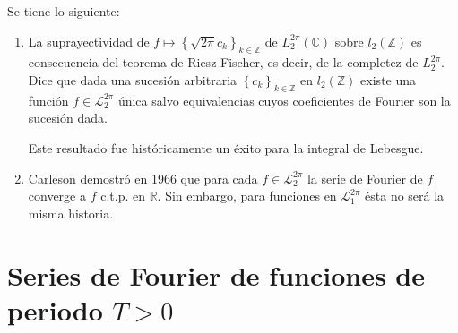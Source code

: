 \documentclass[12pt]{report}
\theoremstyle{largebreak}
\begin{document}
    \begin{obs}
        Se tiene lo siguiente:
        \begin{enumerate}
            \item La suprayectividad de $f\mapsto\left\{\sqrt{2\pi}c_k \right\}_{ k\in\mathbb{Z}}$ de $L_2^{2\pi}(\mathbb{C})$ sobre $l_2(\mathbb{Z})$ es consecuencia del teorema de Riesz-Fischer, es decir, de la completez de $L_2^{2\pi}$. Dice que dada una sucesión arbitraria $\left\{c_k\right\}_{k\in\mathbb{Z}}$ en $l_2(\mathbb{Z})$ existe una función $f\in\mathcal{L}_2^{2\pi}$ única salvo equivalencias cuyos coeficientes de Fourier son la sucesión dada.
            
            Este resultado fue históricamente un éxito para la integral de Lebesgue.

            \item Carleson demostró en 1966 que para cada $f\in\mathcal{L}_2^{2\pi}$ la serie de Fourier de $f$ converge a $f$ c.t.p. en $\mathbb{R}$. Sin embargo, para funciones en $\mathcal{L}_1^{2\pi}$ ésta no será la misma historia.
        \end{enumerate}
    \end{obs}

    \section{Series de Fourier de funciones de periodo $T>0$}
\end{document}
